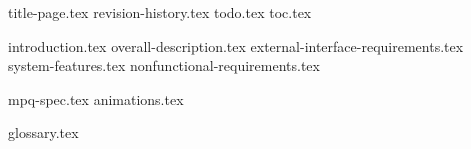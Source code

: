 \documentclass[oneside, openany]{scrbook}
\begin{document}
\frontmatter
{title-page.tex}
{revision-history.tex}
{todo.tex}
{toc.tex} %

\mainmatter
{introduction.tex}
{overall-description.tex}
{external-interface-requirements.tex}
{system-features.tex}
{nonfunctional-requirements.tex}

\begin{appendices}
	{mpq-spec.tex}
	{animations.tex}
\end{appendices}

\backmatter
{glossary.tex}
\end{document}
